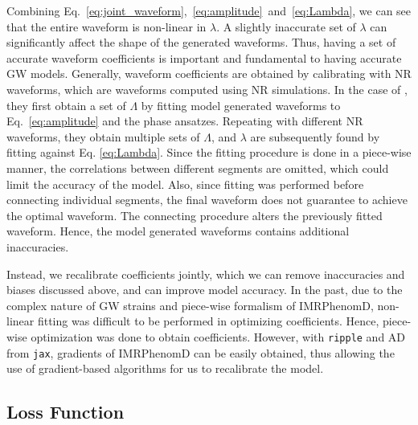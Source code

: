 \documentclass[twocolumn]{aastex631}
\newcommand{\ripple}{\texttt{ripple}}
\newcommand{\jax}{\texttt{jax}}
\newcommand{\kw}[1]{{\color{rb4}[KW: #1 ]}}
\begin{document}
Combining Eq.~\ref{eq:joint_waveform},~\ref{eq:amplitude}~and~\ref{eq:Lambda}, 
we can see that the entire waveform is non-linear in $\lambda$. A slightly 
inaccurate set of $\lambda$ can significantly affect the shape of the generated 
waveforms. Thus, having a set of accurate waveform coefficients is important 
and fundamental to having accurate GW models. Generally, waveform coefficients 
are obtained by calibrating with NR waveforms, which are waveforms computed 
using NR simulations. In the case of \citep{khan2016frequency}, they first 
obtain a set of $\Lambda$ by fitting model generated waveforms to Eq.~\ref{eq:amplitude} 
and the phase ansatzes. Repeating with different NR waveforms, they obtain multiple 
sets of $\Lambda$, and $\lambda$ are subsequently found by fitting against 
Eq. \ref{eq:Lambda}. Since the fitting procedure is done in a piece-wise manner, 
the correlations between different segments are omitted, which could limit the 
accuracy of the model. Also, since fitting was performed before connecting 
individual segments, the final waveform does not guarantee to achieve the optimal 
waveform. The connecting procedure alters the previously fitted waveform. 
Hence, the model generated waveforms contains additional inaccuracies. 

Instead, we recalibrate coefficients jointly, which we can remove inaccuracies
and biases discussed above, and can improve model accuracy. In the past, due to
the complex nature of GW strains and piece-wise formalism of IMRPhenomD,
non-linear fitting was difficult to be performed in optimizing coefficients.
Hence, piece-wise optimization was done to obtain coefficients. However, with
{\ripple} and AD from \jax, gradients of IMRPhenomD can be easily obtained, thus
allowing the use of gradient-based algorithms for us to recalibrate the model.   

\subsection{Loss Function} \label{subsec:loss}
\end{document}
